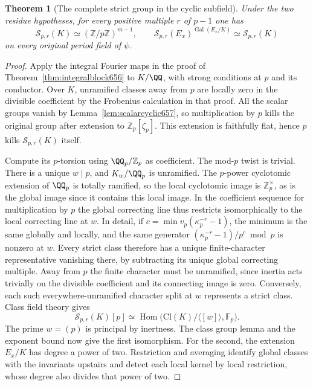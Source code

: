 \documentclass[a4paper,11pt]{article}
\newtheorem{theorem}[proposition]{Theorem}
\theoremstyle{definition}
\theoremstyle{remark}
\newcommand{\ZZ}{\mathbb Z}\newcommand{\ord}{\operatorname{ord}}
\numberwithin{equation}{section}
\begin{document}
\begin{theorem}[The complete strict group in the cyclic subfield]
\leavevmode\label{thm:strictcyclic657}
Under the two residue hypotheses, for every positive multiple
\(r\) of \(p-1\) one has
\[
 \mathcal S_{p,r}(K)\simeq(\ZZ/p\ZZ)^{m-1},\qquad
 \mathcal S_{p,r}(E_x)^{\operatorname{Gal}(E_x/K)}
                 \simeq\mathcal S_{p,r}(K)
\]
on every original period field of \(\psi\).
\end{theorem}
\begin{proof}
Apply the integral Fourier maps in the proof of
Theorem~\ref{thm:integralblock656} to \(K/\QQ\), with strong
conditions at \(p\) and its conductor. Over \(K\), unramified
classes away from \(p\) are locally zero in the divisible
coefficient by the Frobenius calculation in that proof.
All the scalar groups vanish by Lemma~\ref{lem:scalarcyclic657},
so multiplication by \(p\) kills the original group after
extension to \(\ZZ_p[\zeta_p]\). This extension is faithfully
flat, hence \(p\) kills \(\mathcal S_{p,r}(K)\) itself.

Compute its \(p\)-torsion using \(\QQ_p/\ZZ_p\) as coefficient.
The mod-\(p\) twist is trivial. There is a unique \(w\mid p\),
and \(K_w/\QQ_p\) is unramified. The \(p\)-power cyclotomic
extension of \(\QQ_p\) is totally ramified, so the local
cyclotomic image is \(\ZZ_p^\times\), as is the global image
since it contains this local image. In the coefficient sequence
for multiplication by \(p\) the global correcting line thus
restricts isomorphically to the local correcting line at \(w\).
In detail, if \(c=\min v_p(\kappa_p^{-r}-1)\), the minimum is
the same globally and locally, and the same generator
\((\kappa_p^{-r}-1)/p^c\bmod p\) is nonzero at \(w\).
Every strict class therefore has a unique finite-character
representative vanishing there, by subtracting its unique
global correcting multiple. Away from \(p\) the finite
character must be unramified, since inertia acts trivially
on the divisible coefficient and its connecting image is zero.
Conversely, each such everywhere-unramified character split
at \(w\) represents a strict class. Class field theory gives
\[
    \mathcal S_{p,r}(K)[p]\simeq
       \operatorname{Hom}\bigl(\mathrm{Cl}(K)/\langle[w]\rangle,
                                     \mathbb F_p\bigr).
\]
The prime \(w=(p)\) is principal by inertness. The class group
lemma and the exponent bound now give the first isomorphism.
For the second, the extension \(E_x/K\) has degree a power of
two. Restriction and averaging identify global classes with
the invariants upstairs and detect each local kernel by local
restriction, whose degree also divides that power of two.
\end{proof}
\end{document}

